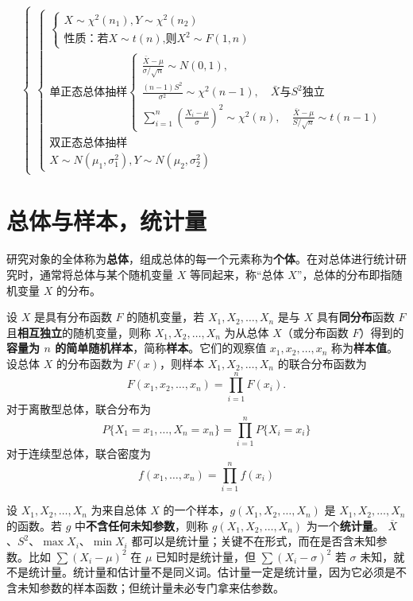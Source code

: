 \documentclass[lang=cn,11pt]{elegantbook}
\begin{document}
{\[\begin{cases}
\begin{cases}
\begin{cases}
X\sim\chi^2(n_1),Y\sim\chi^2(n_2) \\
\text{性质：若}X\sim t(n)\text{,则}X^2\sim F(1,n)
\end{cases} \\
\text{单正态总体抽样}
\begin{cases}
\displaystyle\frac{\bar{X}-\mu}{\sigma/\sqrt{n}}\sim N(0,1),\\
\frac{(n-1)S^2}{\sigma^2}\sim\chi^2(n-1),\quad
\bar{X}\text{与}S^2\text{独立}\\
\displaystyle\sum_{i=1}^n\left(\frac{X_i-\mu}{\sigma}\right)^2\sim\chi^2(n),\quad
\frac{\bar{X}-\mu}{S/\sqrt{n}}\sim t(n-1)
\end{cases} \\
\text{双正态总体抽样}\\
X\sim N(\mu_1,\sigma_1^2),Y\sim N(\mu_2,\sigma_2^2)
\end{cases}
\end{cases}
\]
}
\section{总体与样本，统计量}

\begin{definition}[总体与个体] \label{def:population}
研究对象的全体称为\textbf{总体}，组成总体的每一个元素称为\textbf{个体}。在对总体进行统计研究时，通常将总体与某个随机变量 \(X\) 等同起来，称“总体 \(X\)”，总体的分布即指随机变量 \(X\) 的分布。
\end{definition}

\begin{definition}[简单随机样本的分布函数] \label{def:sample}
设 \(X\) 是具有分布函数 \(F\) 的随机变量，若 \(X_1, X_2, \dots, X_n\) 是与 \(X\) 具有\textbf{同分布}函数 \(F\) 且\textbf{相互独立}的随机变量，则称 \(X_1, X_2, \dots, X_n\) 为从总体 \(X\)（或分布函数 \(F\)）得到的\textbf{容量为 \(n\) 的简单随机样本}，简称\textbf{样本}。它们的观察值 \(x_1, x_2, \dots, x_n\) 称为\textbf{样本值}。设总体 \(X\) 的分布函数为 \(F(x)\)，则样本 \(X_1, X_2, \dots, X_n\) 的联合分布函数为
\[
F(x_1, x_2, \dots, x_n) = \prod_{i=1}^{n} F(x_i).
\]
对于离散型总体，联合分布为 \[P\{X_1 = x_1, \dots, X_n = x_n\} = \prod_{i=1}^{n} P\{X_i = x_i\}\]
对于连续型总体，联合密度为 \[f(x_1, \dots, x_n) = \prod_{i=1}^{n} f(x_i)\]
\end{definition}

\begin{definition}[统计量] \label{def:statistic}
设 \(X_1, X_2, \dots, X_n\) 为来自总体 \(X\) 的一个样本，\(g(X_1, X_2, \dots, X_n)\) 是 \(X_1, X_2, \dots, X_n\) 的函数。若 \(g\) 中\textbf{不含任何未知参数}，则称 \(g(X_1, X_2, \dots, X_n)\) 为一个\textbf{统计量}。 \(\overline{X}\)、\(S^2\)、\(\max X_i\)、\(\min X_i\) 都可以是统计量；关键不在形式，而在是否含未知参数。比如 \(\sum (X_i-\mu)^2\) 在 \(\mu\) 已知时是统计量，但 \(\sum (X_i-\sigma)^2\) 若 \(\sigma\) 未知，就不是统计量。统计量和估计量不是同义词。估计量一定是统计量，因为它必须是不含未知参数的样本函数；但统计量未必专门拿来估参数。
\end{definition}
\end{document}
